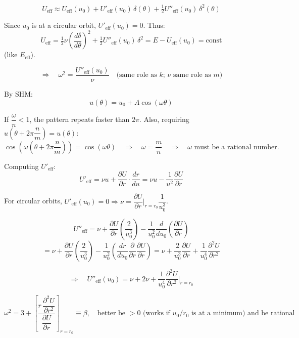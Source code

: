 \[
    U_\text{eff} \approx U_\text{eff}(u_0) + U'_\text{eff}(u_0)\,\delta(\theta)
    + \tfrac{1}{2}U''_\text{eff}(u_0)\,\delta^2(\theta)
\]

Since $u_0$ is at a circular orbit, $U'_\text{eff}(u_0) = 0$. Thus:
\[
    U_\text{eff} = \tfrac{1}{2}\nu\left(\frac{d\delta}{d\theta}\right)^2
    + \tfrac{1}{2}U''_\text{eff}(u_0)\,\delta^2 = E - U_\text{eff}(u_0) = \text{const}
\]
(like $E_\text{eff}$).

\[
    \Rightarrow\quad \omega^2 = \frac{U''_\text{eff}(u_0)}{\nu}
    \quad\text{(same role as $k$; $\nu$ same role as $m$)}
\]

By SHM:
\[
    \boxed{u(\theta) = u_0 + A\cos(\omega\theta)}
\]

If $\dfrac{\omega}{n} < 1$, the pattern repeats faster than $2\pi$. Also, requiring $u\!\left(\theta + 2\pi\dfrac{n}{m}\right) = u(\theta)$:
\[
    \cos\!\left(\omega\!\left(\theta + 2\pi\frac{n}{m}\right)\right) = \cos(\omega\theta)
    \quad\Rightarrow\quad \omega = \frac{m}{n}
    \quad\Rightarrow\quad \omega\text{ must be a rational number.}
\]

Computing $U'_\text{eff}$:
\[
    U'_\text{eff} = \nu u + \frac{\partial U}{\partial r}\cdot\frac{dr}{du}
    = \nu u - \frac{1}{u^2}\frac{\partial U}{\partial r}
\]

For circular orbits, $U'_\text{eff}(u_0) = 0 \Rightarrow \nu = \dfrac{\partial U}{\partial r}\Big|_{r=r_0}\dfrac{1}{u_0^3}$.

\[
    U''_\text{eff} = \nu + \frac{\partial U}{\partial r}\left(\frac{2}{u_0^3}\right)
    - \frac{1}{u_0^2}\frac{d}{du_0}\left(\frac{\partial U}{\partial r}\right)
\]
\[
    = \nu + \frac{\partial U}{\partial r}\left(\frac{2}{u_0^3}\right)
    - \frac{1}{u_0^2}\left(\frac{dr}{du_0}\frac{\partial}{\partial r}\frac{\partial U}{\partial r}\right)
    = \nu + \frac{2}{u_0^3}\frac{\partial U}{\partial r} + \frac{1}{u_0^4}\frac{\partial^2 U}{\partial r^2}
\]

\[
    \Rightarrow\quad U''_\text{eff}(u_0) = \nu + 2\nu + \frac{1}{u_0^4}\frac{\partial^2 U}{\partial r^2}\Bigg|_{r=r_0}
\]

\[
    \omega^2 = 3 + \left[\frac{r\,\dfrac{\partial^2 U}{\partial r^2}}{\dfrac{\partial U}{\partial r}}\right]_{r=r_0}
    \equiv \beta, \quad \text{better be $> 0$ (works if $u_0/r_0$ is at a minimum) and be rational}
\]

